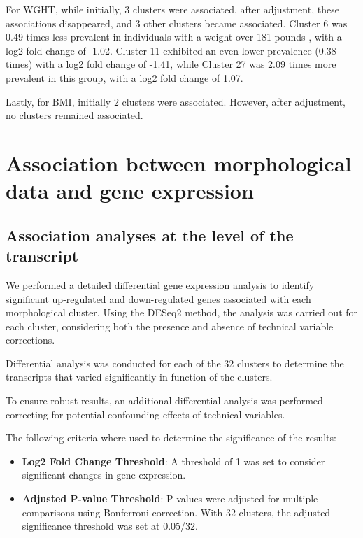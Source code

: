 \documentclass[a4paper, 11pt]{article}
\begin{document}
\begin{multicols}{2}
For WGHT, while initially, 3 clusters were associated, after adjustment, these associations disappeared, and 3 other clusters became associated. Cluster 6 was 0.49 times less prevalent in individuals with a weight over 181 pounds , with a log2 fold change of -1.02. Cluster 11 exhibited an even lower prevalence (0.38 times) with a log2 fold change of -1.41, while Cluster 27 was 2.09 times more prevalent in this group, with a log2 fold change of 1.07.

Lastly, for BMI, initially 2 clusters were associated. However, after adjustment, no clusters remained associated. 



\section{Association between morphological data and gene expression}
\subsection{Association analyses at the level of the transcript}

We performed a detailed differential gene expression analysis to identify significant up-regulated and down-regulated genes associated with each morphological cluster. Using the DESeq2 method, the analysis was carried out for each cluster, considering both the presence and absence of technical variable corrections. 

Differential analysis was conducted for each of the 32 clusters to determine the transcripts that varied significantly in function of the clusters.


To ensure robust results, an additional differential analysis was performed correcting for potential confounding effects of technical variables.

The following criteria where used to determine the significance of the results:
\begin{itemize}
    \item \textbf{Log2 Fold Change Threshold}: A threshold of 1 was set to consider significant changes in gene expression.
    \item \textbf{Adjusted P-value Threshold}: P-values were adjusted for multiple comparisons using Bonferroni correction. With 32 clusters, the adjusted significance threshold was set at 0.05/32.
\end{itemize}


\end{multicols}
\end{document}
